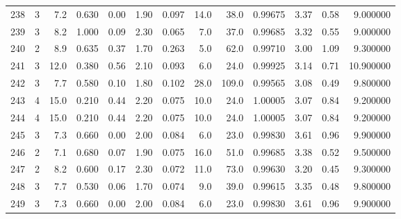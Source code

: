 \begin{tabular}{lrrrrrrrrrrrr}
238  &        3 &            7.2 &             0.630 &         0.00 &            1.90 &      0.097 &                 14.0 &                  38.0 &  0.99675 &  3.37 &       0.58 &   9.000000 \\
239  &        3 &            8.2 &             1.000 &         0.09 &            2.30 &      0.065 &                  7.0 &                  37.0 &  0.99685 &  3.32 &       0.55 &   9.000000 \\
240  &        2 &            8.9 &             0.635 &         0.37 &            1.70 &      0.263 &                  5.0 &                  62.0 &  0.99710 &  3.00 &       1.09 &   9.300000 \\
241  &        3 &           12.0 &             0.380 &         0.56 &            2.10 &      0.093 &                  6.0 &                  24.0 &  0.99925 &  3.14 &       0.71 &  10.900000 \\
242  &        3 &            7.7 &             0.580 &         0.10 &            1.80 &      0.102 &                 28.0 &                 109.0 &  0.99565 &  3.08 &       0.49 &   9.800000 \\
243  &        4 &           15.0 &             0.210 &         0.44 &            2.20 &      0.075 &                 10.0 &                  24.0 &  1.00005 &  3.07 &       0.84 &   9.200000 \\
244  &        4 &           15.0 &             0.210 &         0.44 &            2.20 &      0.075 &                 10.0 &                  24.0 &  1.00005 &  3.07 &       0.84 &   9.200000 \\
245  &        3 &            7.3 &             0.660 &         0.00 &            2.00 &      0.084 &                  6.0 &                  23.0 &  0.99830 &  3.61 &       0.96 &   9.900000 \\
246  &        2 &            7.1 &             0.680 &         0.07 &            1.90 &      0.075 &                 16.0 &                  51.0 &  0.99685 &  3.38 &       0.52 &   9.500000 \\
247  &        2 &            8.2 &             0.600 &         0.17 &            2.30 &      0.072 &                 11.0 &                  73.0 &  0.99630 &  3.20 &       0.45 &   9.300000 \\
248  &        3 &            7.7 &             0.530 &         0.06 &            1.70 &      0.074 &                  9.0 &                  39.0 &  0.99615 &  3.35 &       0.48 &   9.800000 \\
249  &        3 &            7.3 &             0.660 &         0.00 &            2.00 &      0.084 &                  6.0 &                  23.0 &  0.99830 &  3.61 &       0.96 &   9.900000 \\

\end{tabular}
